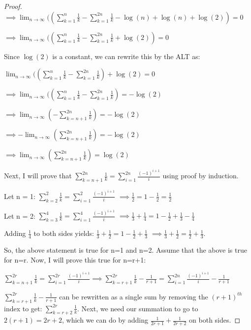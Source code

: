 \documentclass{article}
\begin{document}
\begin{proof}
$\implies \lim_{n \rightarrow \infty} ((\sum_{k=1}^{n} \frac{1}{k} - \sum_{k=1}^{2n} \frac{1}{k} - \log(n) + \log(n) + \log(2)) = 0$

$\implies \lim_{n \rightarrow \infty} ((\sum_{k=1}^{n} \frac{1}{k} - \sum_{k=1}^{2n} \frac{1}{k} + \log(2)) = 0$

Since $\log(2)$ is a constant, we can rewrite this by the ALT as:

$\lim_{n \rightarrow \infty} ((\sum_{k=1}^{n} \frac{1}{k} - \sum_{k=1}^{2n} \frac{1}{k}) + \log(2) = 0$

$\implies \lim_{n \rightarrow \infty} ((\sum_{k=1}^{n} \frac{1}{k} - \sum_{k=1}^{2n} \frac{1}{k}) = -\log(2)$

$\implies \lim_{n \rightarrow \infty} ( - \sum_{k=n+1}^{2n} \frac{1}{k}) = -\log(2)$

$\implies -\lim_{n \rightarrow \infty} (\sum_{k=n+1}^{2n} \frac{1}{k}) = -\log(2)$

$\implies \lim_{n \rightarrow \infty} (\sum_{k=n+1}^{2n} \frac{1}{k}) = \log(2)$



 Next, I will prove that $\sum_{k=n+1}^{2n} \frac{1}{k} =  \sum_{i=1}^{2n} \frac{(-1)^{i+1}}{i}$ using proof by induction.

Let n = 1:
$\sum_{k=2}^{2} \frac{1}{k} =  \sum_{i=1}^{2} \frac{(-1)^{i+1}}{i}$
$ \implies \frac{1}{2} =  1 - \frac{1}{2} = \frac{1}{2}$

Let n = 2:
$\sum_{k=3}^{4} \frac{1}{k} =  \sum_{i=1}^{4} \frac{(-1)^{i+1}}{i}$
$ \implies \frac{1}{3} + \frac{1}{4} =  1 - \frac{1}{2} + \frac{1}{3} - \frac{1}{4}$

Adding $\frac{1}{4}$ to both sides yields:
$\frac{1}{3} + \frac{1}{2} = 1 - \frac{1}{2} + \frac{1}{3}$
$\implies \frac{1}{3} + \frac{1}{2} = \frac{1}{2} + \frac{1}{3}$.

So, the above statement is true for n=1 and n=2. Assume that the above is true for n=r. Now, I will prove this true for n=r+1:

$\sum_{k=n+1}^{2r} \frac{1}{k} =  \sum_{i=1}^{2r} \frac{(-1)^{i+1}}{i} \implies \sum_{k=r+1}^{2r} \frac{1}{k} - \frac{1}{r+1} =  \sum_{i=1}^{2n} \frac{(-1)^{i+1}}{i} - \frac{1}{r+1}$

$\sum_{k=r+1}^{2r} \frac{1}{k} - \frac{1}{r+1}$ can be rewritten as a single sum by removing the $(r+1)^{th}$ index to get: $\sum_{k=r+2}^{2r} \frac{1}{k}$. Next, we need our summation to go to $2(r+1) = 2r + 2$, which we can do by adding $\frac{1}{2r+1} + \frac{1}{2r+2}$ on both sides.


\end{proof}
\end{document}
